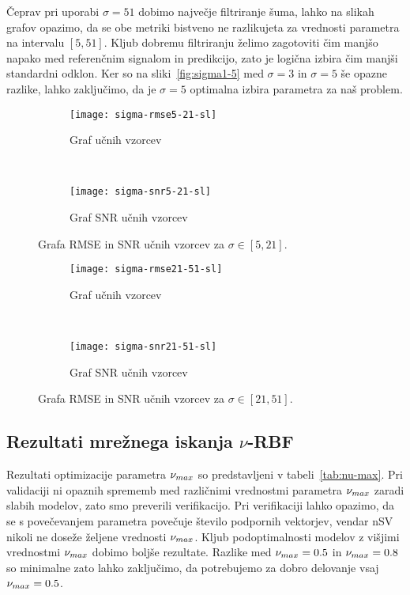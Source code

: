 Čeprav pri uporabi $\sigma=51$ dobimo največje filtriranje šuma, lahko na slikah grafov opazimo, da se obe metriki bistveno ne razlikujeta za vrednosti parametra na intervalu $[5,51]$. Kljub dobremu filtriranju želimo zagotoviti čim manjšo napako med referenčnim signalom in predikcijo, zato je logična izbira čim manjši standardni odklon. Ker so na sliki~\ref{fig:sigma1-5} med $\sigma=3$ in $\sigma=5$ še opazne razlike, lahko zaključimo, da je $\sigma=5$ optimalna izbira parametra za naš problem. 


\begin{figure}[!htb]
	\centering
	\begin{subfigure}[t]{0.45\columnwidth}
		\texttt{[image: sigma-rmse5-21-sl]}
		\caption{Graf \rmse  učnih vzorcev}
		\label{fig:sigma-rmse5-21}
	\end{subfigure}
	~
	\begin{subfigure}[t]{0.45\columnwidth}
		\texttt{[image: sigma-snr5-21-sl]}
		\caption{Graf SNR  učnih vzorcev}
		\label{fig:sigma-snr5-21}
	\end{subfigure}
	\caption[Grafa \rmse in SNR učnih vzorcev za \mbox{$\sigma \in [5,21]$}]{Grafa RMSE in SNR učnih vzorcev za \mbox{$\sigma \in [5,21]$}.}
	\label{fig:sigma5-21}
\end{figure}



\begin{figure}[!htb]
	\centering
	\begin{subfigure}[t]{0.45\columnwidth}
		\texttt{[image: sigma-rmse21-51-sl]}
		\caption{Graf \rmse učnih vzorcev}
		\label{fig:sigma-rmse21-51}
	\end{subfigure}
	~
	\begin{subfigure}[t]{0.45\columnwidth}
		\texttt{[image: sigma-snr21-51-sl]}
		\caption{Graf SNR  učnih vzorcev}
		\label{fig:sigma-snr21-51}
	\end{subfigure}
	\caption[Grafa \rmse in SNR učnih vzorcev za \mbox{$\sigma \in [21,51]$}]{Grafa RMSE in SNR učnih vzorcev za \mbox{$\sigma \in [21,51]$}.}
	\label{fig:sigma21-51}
\end{figure}


\subsection{Rezultati mrežnega iskanja \texorpdfstring{$\nu$}{nu}-RBF}
Rezultati optimizacije parametra $\nu_{max}$ so predstavljeni v tabeli~\ref{tab:nu-max}. Pri validaciji ni opaznih sprememb med različnimi vrednostmi parametra $\nu_{max}$ zaradi slabih modelov, zato smo preverili verifikacijo. Pri verifikaciji lahko opazimo, da se s povečevanjem parametra povečuje število podpornih vektorjev, vendar nSV nikoli ne doseže željene vrednosti $\nu_{max}$. Kljub podoptimalnosti modelov z višjimi vrednostmi $\nu_{max}$ dobimo boljše rezultate. Razlike med $\nu_{max}=\num{0.5}$ in $\nu_{max}=\num{0.8}$ so minimalne zato lahko zaključimo, da potrebujemo za dobro delovanje vsaj $\nu_{max}=\num{0.5}$. 

